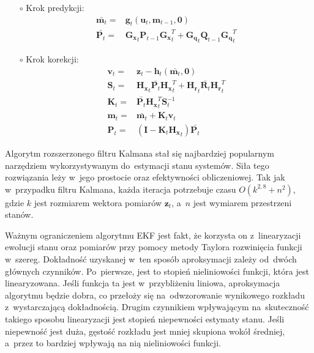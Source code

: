 \begin{itemize}
	\item[$\circ$] Krok predykcji:
	\begin{align}
	\bar{\boldsymbol{m}_{t}} =& \boldsymbol{g}_t(\boldsymbol{u}_t, \boldsymbol{m}_{t-1}, \boldsymbol{0}) \nonumber \\
	\bar{\mathbf{P}_{t}} =& \mathbf{G_x}_{t} \mathbf{P}_{t-1} \mathbf{G_x}_{t}^T + \mathbf{G_q}_{t} \mathbf{Q}_{t-1} \mathbf{G_q}_{t}^T
	\end{align}
	\item[$\circ$] Krok korekcji:
	\begin{align}
	\mathbf{v}_t=&\mathbf{z}_t-\boldsymbol{h}_t(\bar{\boldsymbol{m}_{t}}, \boldsymbol{0}) \nonumber \\
	\mathbf{S}_t=&\mathbf{H_x}_t \bar{\mathbf{P}_{t}} \mathbf{H_x}_t^T + \mathbf{H_r}_t \bar{\mathbf{R}_{t}} \mathbf{H_r}_t^T \nonumber \\
	\mathbf{K}_t=&\bar{\mathbf{P}_{t}} \mathbf{H_x}_t^T \mathbf{S}_t^{-1}\nonumber \\
	\mathbf{m}_{t}=&\bar{\mathbf{m}_{t}} + \mathbf{K}_t \mathbf{v}_t\nonumber \\
	\mathbf{P}_{t}=&(\mathbf{I} - \mathbf{K}_t \mathbf{H_x}_t) \bar{\mathbf{P}_{t}}
	\end{align}
\end{itemize}
\par
Algorytm rozszerzonego filtru Kalmana stał się najbardziej popularnym narzędziem wykorzystywanym do~estymacji stanu systemów. Siła tego rozwiązania leży w~jego prostocie oraz efektywności obliczeniowej. Tak jak w~przypadku filtru Kalmana, każda iteracja potrzebuje czasu $O(k^{2,8} + n^2)$, gdzie $k$ jest rozmiarem wektora pomiarów $\boldsymbol{z}_t$, a~$n$ jest wymiarem przestrzeni stanów.
\par
Ważnym ograniczeniem algorytmu EKF jest fakt, że korzysta on z~linearyzacji ewolucji stanu oraz pomiarów przy pomocy metody Taylora rozwinięcia funkcji w~szereg. Dokładność uzyskanej w~ten sposób aproksymacji zależy od~dwóch głównych czynników. Po~pierwsze, jest to stopień nieliniowości funkcji, która jest linearyzowana. Jeśli funkcja ta jest w~przybliżeniu liniowa, aproksymacja algorytmu będzie dobra, co przełoży się na~odwzorowanie wynikowego rozkładu z~wystarczającą dokładnością. Drugim czynnikiem wpływającym na~skuteczność takiego sposobu linearyzacji jest stopień niepewności estymaty stanu. Jeśli niepewność jest duża, gęstość rozkładu jest mniej skupiona wokół średniej, a~przez to bardziej wpływają na nią nieliniowości funkcji. \cite[53-54]{Thrun}
